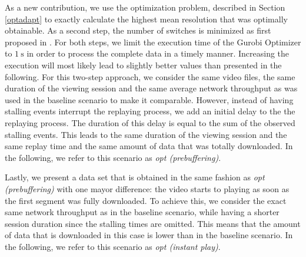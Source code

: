As a new contribution, we use the optimization problem, described in Section \ref{optadapt} to exactly calculate the highest mean resolution that was optimally obtainable. As a second step, the number of switches is minimized as first proposed in \cite{miller2013optimal}. For both steps, we limit the execution time of the Gurobi Optimizer to $\SI{1}{\second}$ in order to process the complete data in a timely manner. Increasing the execution will most likely lead to slightly better values than presented in the following. For this two-step approach, we consider the same video files, the same duration of the viewing session and the same average network throughput as was used in the baseline scenario to make it comparable. However, instead of having stalling events interrupt the replaying process, we add an initial delay to the the replaying process. The duration of this delay is equal to the sum of the observed stalling events. This leads to the same duration of the viewing session and the same replay time and the same amount of data that was totally downloaded. In the following, we refer to this scenario as \textit{opt (prebuffering)}.

Lastly, we present a data set that is obtained in the same fashion as \textit{opt (prebuffering)} with one mayor difference: the video starts to playing as soon as the first segment was fully downloaded. To achieve this, we consider the exact same network throughput as in the baseline scenario, while having a shorter session duration since the stalling times are omitted. This means that the amount of data that is downloaded in this case is lower than in the baseline scenario. In the following, we refer to this scenario as \textit{opt (instant play)}.
